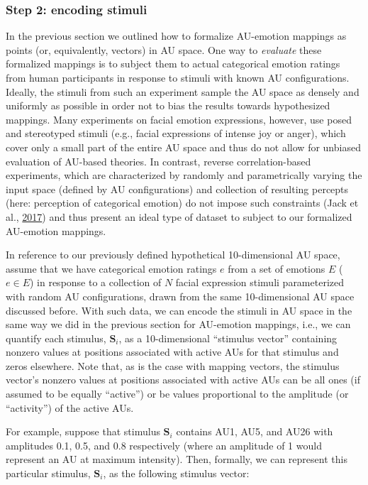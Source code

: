 \documentclass[12pt,american,a4paper,oneside,]{memoir} %
\begin{document}
\hypertarget{step-2-encoding-stimuli}{%
\subsubsection{Step 2: encoding stimuli}\label{step-2-encoding-stimuli}}

In the previous section we outlined how to formalize AU-emotion mappings as points (or, equivalently, vectors) in AU space. One way to \emph{evaluate} these formalized mappings is to subject them to actual categorical emotion ratings from human participants in response to stimuli with known AU configurations. Ideally, the stimuli from such an experiment sample the AU space as densely and uniformly as possible in order not to bias the results towards hypothesized mappings. Many experiments on facial emotion expressions, however, use posed and stereotyped stimuli (e.g., facial expressions of intense joy or anger), which cover only a small part of the entire AU space and thus do not allow for unbiased evaluation of AU-based theories. In contrast, reverse correlation-based experiments, which are characterized by randomly and parametrically varying the input space (defined by AU configurations) and collection of resulting percepts (here: perception of categorical emotion) do not impose such constraints (Jack et al., \protect\hyperlink{ref-Jack2017-qp}{2017}) and thus present an ideal type of dataset to subject to our formalized AU-emotion mappings.

In reference to our previously defined hypothetical 10-dimensional AU space, assume that we have categorical emotion ratings \(e\) from a set of emotions \(E\) (\(e \in E\)) in response to a collection of \(N\) facial expression stimuli parameterized with random AU configurations, drawn from the same 10-dimensional AU space discussed before. With such data, we can encode the stimuli in AU space in the same way we did in the previous section for AU-emotion mappings, i.e., we can quantify each stimulus, \(\mathbf{S}_{i}\), as a 10-dimensional ``stimulus vector'' containing nonzero values at positions associated with active AUs for that stimulus and zeros elsewhere. Note that, as is the case with mapping vectors, the stimulus vector's nonzero values at positions associated with active AUs can be all ones (if assumed to be equally ``active'') or be values proportional to the amplitude (or ``activity'') of the active AUs.

For example, suppose that stimulus \(\mathbf{S}_{i}\) contains AU1, AU5, and AU26 with amplitudes 0.1, 0.5, and 0.8 respectively (where an amplitude of 1 would represent an AU at maximum intensity). Then, formally, we can represent this particular stimulus, \(\mathbf{S}_{i}\), as the following stimulus vector:
\end{document}
